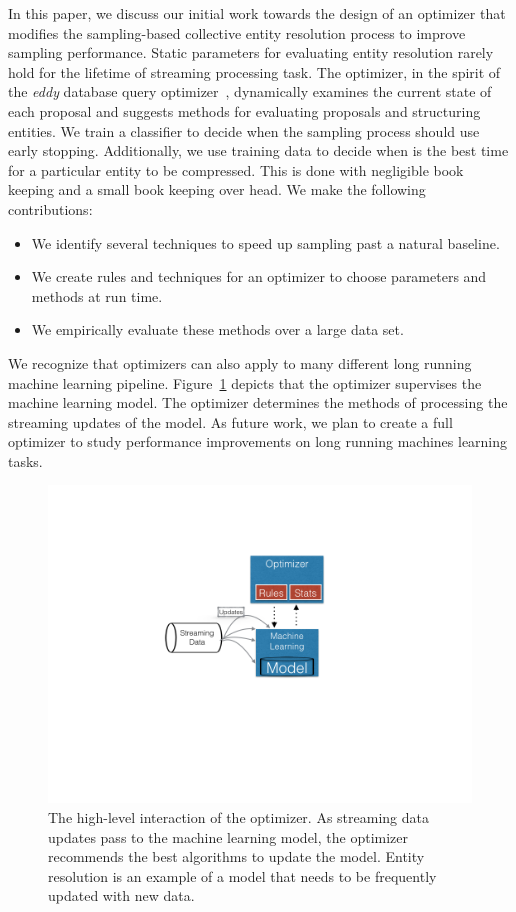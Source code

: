 In this paper, we discuss our initial work towards the design of an optimizer that modifies the
sampling-based collective entity resolution process to improve sampling performance.
Static parameters for evaluating entity resolution rarely hold for the lifetime of streaming processing task.
The optimizer, in the spirit of the \textit{eddy} database query optimizer~\cite{avnur2000eddies}, dynamically examines the
current state of each proposal and suggests methods for evaluating proposals and structuring entities.
We train a classifier to decide when the sampling process should use early stopping.
Additionally, we use training data to decide when is the best time for a particular entity to be compressed.
This is done with negligible book keeping and a small book keeping over head.
We make the following contributions:
\begin{itemize}
\item We identify several techniques to speed up sampling past a natural baseline.
\item We create rules and techniques for an optimizer to choose parameters and methods at run time.
\item We empirically evaluate these methods over a large data set.
\end{itemize}
We recognize that optimizers can also apply to many different long running machine learning pipeline.
Figure~\ref{fig:optimizer-arch} depicts that the optimizer supervises the machine learning model.
The optimizer determines the methods of processing the streaming updates of the model. 
As future work, we plan to create a full optimizer to study performance improvements on long running machines learning tasks.


\begin{figure}
\centering
\includegraphics[width=\columnwidth, clip=true, trim= 25em 30em 30em 17em]{media/optimizer/optimizer.png}
\caption{The high-level interaction of the optimizer. As streaming data updates pass to the machine learning model, the optimizer recommends the best algorithms to update the model. Entity resolution is an example of a model that needs to be frequently updated with new data.}
\label{fig:optimizer-arch}
\end{figure}


